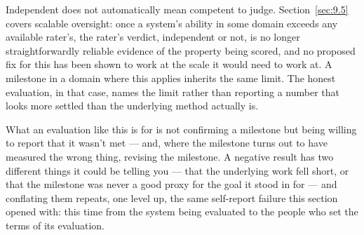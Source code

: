 Independent does not automatically mean competent to judge. Section~\ref{sec:9.5} covers scalable oversight: once a system's ability in some domain exceeds any available rater's, the rater's verdict, independent or not, is no longer straightforwardly reliable evidence of the property being scored, and no proposed fix for this has been shown to work at the scale it would need to work at. A milestone in a domain where this applies inherits the same limit. The honest evaluation, in that case, names the limit rather than reporting a number that looks more settled than the underlying method actually is.

What an evaluation like this is for is not confirming a milestone but being willing to report that it wasn't met — and, where the milestone turns out to have measured the wrong thing, revising the milestone. A negative result has two different things it could be telling you — that the underlying work fell short, or that the milestone was never a good proxy for the goal it stood in for — and conflating them repeats, one level up, the same self-report failure this section opened with: this time from the system being evaluated to the people who set the terms of its evaluation. 